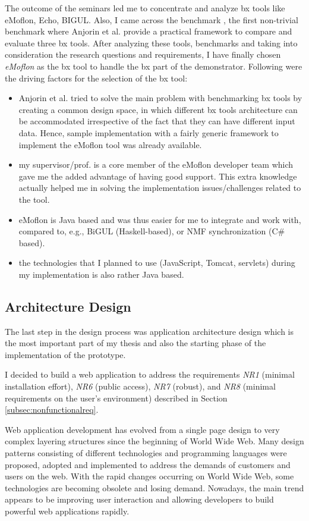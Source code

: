The outcome of the seminars led me to concentrate and analyze bx tools like eMoflon, Echo, BIGUL. Also, I came across the benchmark \cite{benchmarx} \cite{benchmarx-reload}, the first non-trivial benchmark where Anjorin et al. provide a practical framework to compare and evaluate three bx tools. After analyzing these tools, benchmarks and taking into consideration the research questions and requirements, I have finally chosen \textit{eMoflon} as the bx tool to handle the bx part of the demonstrator. Following were the driving factors for the selection of the bx tool:
\begin{itemize}
	\item {Anjorin et al. \cite{benchmarx-reload} tried to solve the main problem with benchmarking bx tools by creating a common design space, in which different bx tools architecture can be accommodated irrespective of the fact that they can have different input data. Hence, sample implementation with a fairly generic framework to implement the eMoflon tool was already available.}
	\item {my supervisor/prof. is a core member of the eMoflon developer team which gave me the added advantage of having good support. This extra knowledge actually helped me in solving the implementation issues/challenges related to the tool.}
	\item {eMoflon is Java based and was thus easier for me to integrate and work with, compared to, e.g., BiGUL (Haskell-based), or NMF synchronization (C\# based).}
	\item {the technologies that I planned to use (JavaScript, Tomcat, servlets) during my implementation is also rather Java based.}
\end{itemize}

\subsection{Architecture Design}\label{subsec:architecturedesign}
The last step in the design process was application architecture design which is the most important part of my thesis and also the starting phase of the implementation of the prototype.

I decided to build a web application to address the requirements \textit{NR1} (minimal installation effort), \textit{NR6} (public access), \textit{NR7} (robust), and \textit{NR8} (minimal requirements on the user's environment) described in Section \ref{subsec:nonfunctionalreq}.

Web application development has evolved from a single page design to very complex layering structures since the beginning of World Wide Web. Many design patterns \cite{designpattern} \cite{designpattern-notes} consisting of different technologies and programming languages were proposed, adopted and implemented to address the demands of customers and users on the web. With the rapid changes occurring on World Wide Web, some technologies are becoming obsolete and losing demand. Nowadays, the main trend appears to be improving user interaction and allowing developers to build powerful web applications rapidly.

